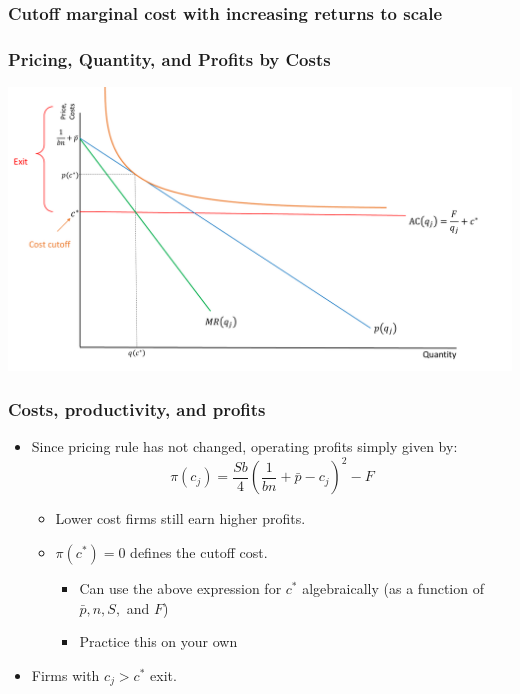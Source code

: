 \documentclass{beamer}
\begin{document}
\begin{frame}
	\frametitle{Cutoff marginal cost with increasing returns to scale}
	
		\frametitle{Pricing, Quantity, and Profits by Costs}
		\includegraphics[scale=0.32]{SL4_1.pdf}
		
\end{frame}

\begin{frame}
	\frametitle{Costs, productivity, and profits}
	\begin{itemize}
		\item Since pricing rule has not changed, operating profits simply given by:
					\begin{equation}
					\pi(c_j)=\frac{Sb}{4}\left(\frac{1}{bn}+\bar{p} -c_j \right)^2 -F \nonumber
					\end{equation}
						\begin{itemize}
							\item Lower cost firms still earn higher profits.
							\item $\pi(c^*)=0$ defines the cutoff cost.
									\begin{itemize}
										\item Can use the above expression for $c^*$ algebraically (as a function of $\bar{p},n,S,$ and $F$)
										\item Practice this on your own 
									\end{itemize}
						\end{itemize}
							\item Firms with $c_j > c^* $ exit.
			\end{itemize}

	


\end{frame}
\end{document}
